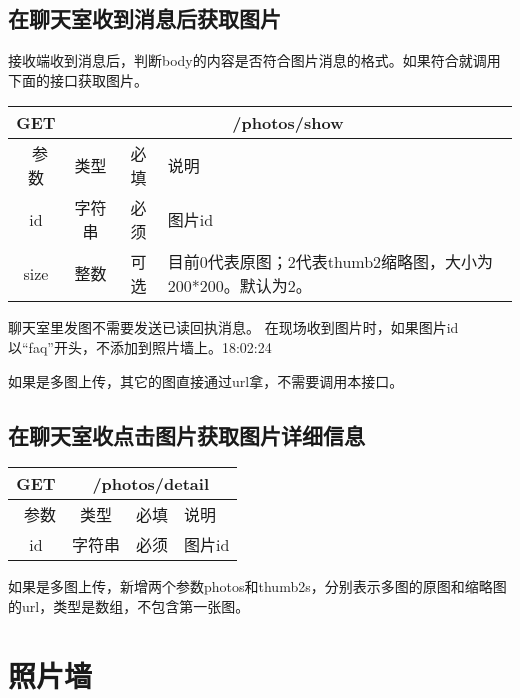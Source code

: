 \subsection{在聊天室收到消息后获取图片}

接收端收到消息后，判断body的内容是否符合图片消息的格式。如果符合就调用下面的接口获取图片。

\begin{table}[H]
   \begin{center}
\begin{tabular}{|c|c|c|p{12cm}|}
\hline
GET & \multicolumn{3}{|c|}{/photos/show} \\
\hline\hline
 \  参数  & 类型 & 必填 &  说明  \\
  \hline
 id  & 字符串 & 必须 & 图片id\\
\hline
 size  & 整数 & 可选 &  目前0代表原图；2代表thumb2缩略图，大小为200*200。默认为2。\\ 
\hline
\end{tabular}
   \end{center}
\end{table}

聊天室里发图不需要发送已读回执消息。
在现场收到图片时，如果图片id以“faq”开头，不添加到照片墙上。18:02:24

如果是多图上传，其它的图直接通过url拿，不需要调用本接口。


\subsection{在聊天室收点击图片获取图片详细信息}

\begin{table}[H]
   \begin{center}
\begin{tabular}{|c|c|c|p{12cm}|}
\hline
GET & \multicolumn{3}{|c|}{/photos/detail} \\
\hline\hline
 \  参数  & 类型 & 必填 &  说明  \\
  \hline
 id  & 字符串 & 必须 & 图片id\\
\hline
\end{tabular}
   \end{center}
\end{table}
如果是多图上传，新增两个参数photos和thumb2s，分别表示多图的原图和缩略图的url，类型是数组，不包含第一张图。



\section{照片墙}

